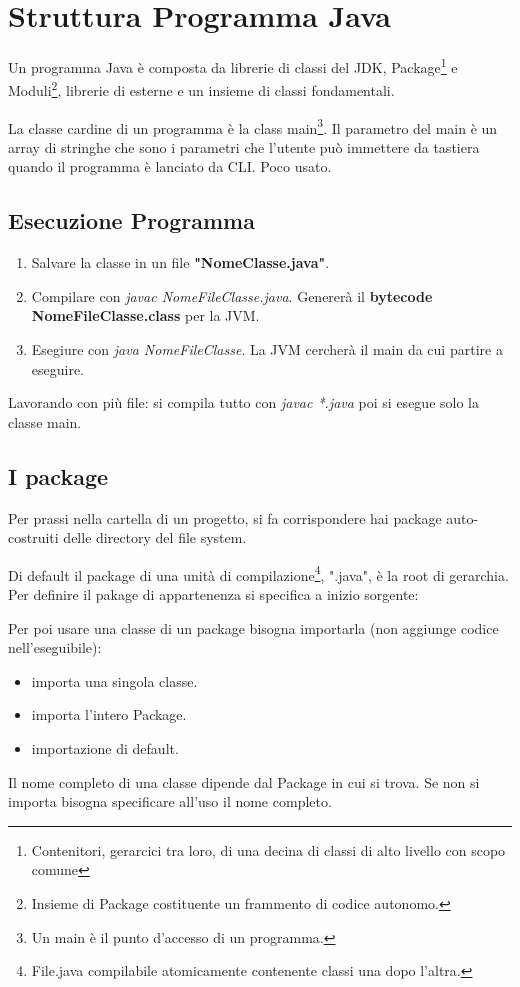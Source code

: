 \section{Struttura Programma Java}
Un programma Java è composta da librerie di classi del JDK, Package\footnote{Contenitori, gerarcici tra loro, di una decina di classi di alto livello con scopo comune} e Moduli\footnote{Insieme di Package costituente un frammento di codice autonomo.}, librerie di esterne e un insieme di classi fondamentali.

La classe cardine di un programma è la class main\footnote{Un main è il punto d'accesso di un programma.}.
Il parametro del main è un array di stringhe che sono i parametri che l'utente può immettere da tastiera quando il programma è lanciato da CLI. Poco usato.

\subsection{Esecuzione Programma}
\begin{enumerate}
	\item Salvare la classe in un file \textbf{"NomeClasse.java"}.
	\item Compilare con \textit{javac NomeFileClasse.java}. Genererà il \textbf{bytecode NomeFileClasse.class} per la JVM.
	\item Esegiure con \textit{java NomeFileClasse}. La JVM cercherà il main da cui partire a eseguire.
\end{enumerate}
Lavorando con più file: si compila tutto con \textit{javac *.java} poi si esegue solo la classe main.

\subsection{I package}
Per prassi nella cartella di un progetto, si fa corrispondere hai package auto-costruiti delle directory del file system.

Di default il package di una unità di compilazione\footnote{File.java compilabile atomicamente contenente classi una dopo l'altra.}, ".java", è la root di gerarchia.
Per definire il pakage di appartenenza si specifica a inizio sorgente:


Per poi usare una classe di un package bisogna importarla (non aggiunge codice nell'eseguibile):
\begin{itemize}
	\item {} importa una singola classe.
	\item {} importa l'intero Package.
	\item {} importazione di default.
\end{itemize}
Il nome completo di una classe dipende dal Package in cui si trova. Se non si importa bisogna specificare all'uso il nome completo.


